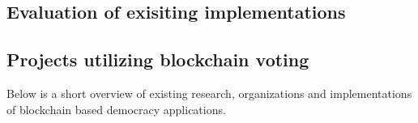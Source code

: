 \documentclass[9pt,oneside]{amsart}
\begin{document}
\begin{multicols}{2}
\section{Evaluation of exisiting implementations}

\subsection{Projects utilizing blockchain voting}
Below is a short overview of existing research, organizations and implementations of blockchain based democracy applications.


\end{multicols}
\end{document}
